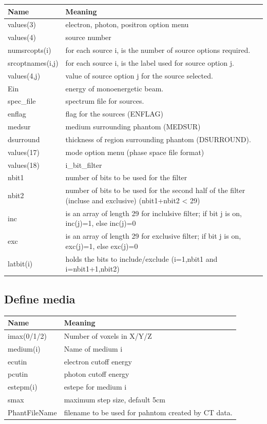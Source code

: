 \documentclass[12pt]{book}
\begin{document}
\begin{tabular} {|p{1.5in}|p{3.75in}|}
\hline
Name & Meaning \\ \hline
values(3) & electron, photon, positron option menu\\
values(4) & source number\\
numsrcopts(i) & for each source i, is the number of source options required.\\
srcoptnames(i,j) & for each source i, is the label used for source option j.\\
values(4,j) & value of source option j for the source selected.\\
Ein & energy of monoenergetic beam.\\
spec\_file & spectrum file for sources.\\
enflag & flag for the sources (ENFLAG)\\
medsur & medium surrounding phantom (MEDSUR) \\
dsurround & thickness of region surrounding phantom (DSURROUND).\\
values(17) & mode option menu (phase space file format) \\
values(18) & i\_bit\_filter \\
nbit1 &  number of bits to be used for the filter\\
nbit2 & number of bits to be used for the second half of the filter
(incluse and exclusive) (nbit1+nbit2 < 29) \\
inc & is an array of length 29 for inclulsive filter; if bit j is on,
inc(j)=1, else inc(j)=0\\
exc & is an array of length 29 for exclusive filter; if bit j is on,
exc(j)=1, else exc(j)=0\\
latbit(i) & holds the bits to include/exclude (i=1,nbit1 and i=nbit1+1,nbit2)\\
\hline
\end{tabular}

\subsection{Define media}

\begin{tabular} {|p{1.5in}|p{3.75in}|}
\hline
Name & Meaning \\ \hline
imax(0/1/2) & Number of voxels in X/Y/Z \\
medium(i) & Name of medium i  \\
ecutin &  electron cutoff energy\\
pcutin &  photon cutoff energy\\
estepm(i) & estepe for medium i \\
smax  & maximum step size, default 5cm \\
PhantFileName &  filename to be used for pahntom created by CT data.\\ \hline
\end{tabular}
\end{document}
